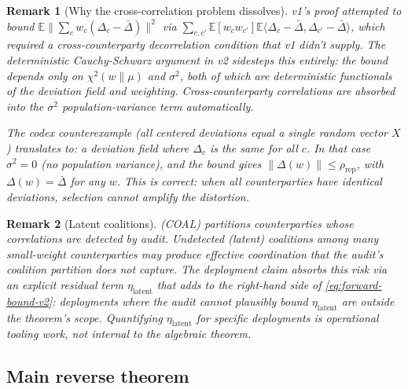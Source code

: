 \documentclass{article}
\newtheorem{remark}{Remark}
\newcommand{\chisq}{\chi^2}
\begin{document}
\begin{remark}[Why the cross-correlation problem dissolves]
\label{rem:no-cross-corr}
v1's proof attempted to bound
$\mathbb{E}\|\sum_c w_c (\Delta_c - \bar\Delta)\|^2$ via
$\sum_{c,c'} \mathbb{E}[w_c w_{c'}] \mathbb{E}\langle \Delta_c -
\bar\Delta, \Delta_{c'} - \bar\Delta\rangle$, which required a
cross-counterparty decorrelation condition that v1 didn't supply.
The deterministic Cauchy-Schwarz argument in v2 sidesteps this
entirely: the bound depends only on $\chisq(w \|\mu)$ and $\sigma^2$,
both of which are deterministic functionals of the deviation field
and weighting.  Cross-counterparty correlations are absorbed into
the $\sigma^2$ population-variance term automatically.

The codex counterexample (all centered deviations equal a single
random vector $X$) translates to: a deviation field where
$\Delta_c$ is the same for all $c$.  In that case $\sigma^2 = 0$
(no population variance), and the bound gives $\|\Delta(w)\| \leq
\rho_\mathrm{rep}$, with $\Delta(w) = \bar\Delta$ for any $w$.
This is correct: when all counterparties have identical deviations,
selection cannot amplify the distortion.
\end{remark}

\begin{remark}[Latent coalitions]
\label{rem:latent-coalitions}
(COAL) partitions counterparties whose correlations are
\emph{detected} by audit.  Undetected (latent) coalitions among
many small-weight counterparties may produce effective coordination
that the audit's coalition partition does not capture.  The
deployment claim absorbs this risk via an explicit residual term
$\eta_\mathrm{latent}$ that adds to the right-hand side of
\eqref{eq:forward-bound-v2}: deployments where the audit cannot
plausibly bound $\eta_\mathrm{latent}$ are outside the theorem's
scope.  Quantifying $\eta_\mathrm{latent}$ for specific deployments
is operational tooling work, not internal to the algebraic theorem.
\end{remark}

\subsection{Main reverse theorem}
\end{document}
